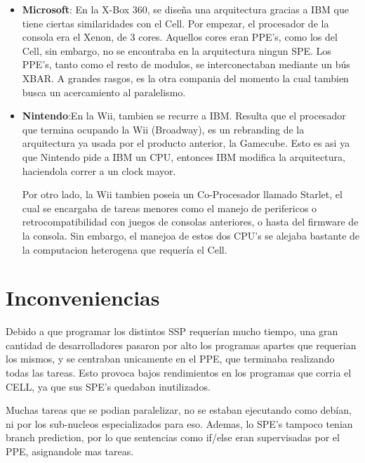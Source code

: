 \documentclass[10pt,compsoc]{IEEEtran}
\begin{document}
	\begin{itemize}
				
		\item{{\bf{Microsoft}}: En la X-Box 360, se diseña una arquitectura gracias a IBM que tiene ciertas similaridades con el Cell. Por empezar, el procesador de la consola era el Xenon, de 3 cores. Aquellos cores eran PPE's, como los del Cell, sin embargo, no se encontraba en la arquitectura ningun SPE. Los PPE's, tanto como el resto de modulos, se interconectaban mediante un bús XBAR. A grandes rasgos, es la otra compania del momento la cual tambien busca un acercamiento al paralelismo.}\newline
		
		\item{{\bf{Nintendo}}:En la Wii, tambien se recurre a IBM. Resulta que el procesador que termina ocupando la Wii (Broadway), es un rebranding de la arquitectura ya usada por el producto anterior, la Gamecube. Esto es asi ya que Nintendo pide a IBM un CPU, entonces IBM modifica la arquitectura, haciendola correr a un clock mayor.\newline
		
		Por otro lado, la Wii tambien poseia un Co-Procesador llamado Starlet, el cual se encargaba de tareas menores como el manejo de perifericos o retrocompatibilidad con juegos de consolas anteriores, o hasta del firmware de la consola. Sin embargo, el manejoa de estos dos CPU's se alejaba bastante de la computacion heterogena que requería el Cell.}
	\end{itemize}
	
	\section{Inconveniencias}
	\noindent Debido a que programar los distintos SSP requerían mucho tiempo, una gran cantidad  de desarrolladores pasaron por alto los programas apartes que requerian los mismos, y se centraban unicamente en el PPE, que terminaba realizando todas las tareas. Esto provoca bajos rendimientos en los programas que corria el CELL, ya que sus SPE's quedaban inutilizados.\newline
	
	Muchas tareas que se podian paralelizar, no se estaban ejecutando como debían, ni por los sub-nucleos especializados para eso. Ademas, lo SPE's tampoco tenian branch prediction, por lo que sentencias como if/else eran supervisadas por el PPE, asignandole mas tareas.\newline
	
\end{document}
